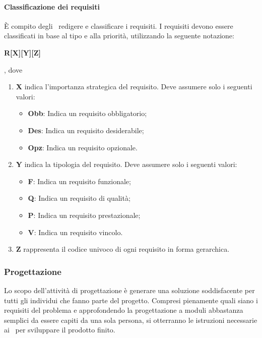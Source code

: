 \documentclass[../NormeProgetto.tex]{subfiles}
\begin{document}
				\paragraph{Classificazione dei requisiti}
					È compito degli \analisti\ redigere e classificare i requisiti.  I requisiti devono essere classificati in base al tipo e alla priorità, utilizzando la seguente notazione:
					\begin{center}\textbf{R[X][Y][Z]}\end{center}, dove
						\begin{enumerate}
							\item \textbf{X} indica l'importanza strategica del requisito. Deve assumere solo i seguenti valori:
							\begin{itemize}
								\item \textbf{Obb}: Indica un requisito obbligatorio;
								\item \textbf{Des}: Indica un requisito desiderabile;
								\item \textbf{Opz}: Indica un requisito opzionale.
							\end{itemize}
							\item \textbf{Y} indica la tipologia del requisito. Deve assumere solo i seguenti valori:
							\begin{itemize}
								\item \textbf{F}: Indica un requisito funzionale;
								\item \textbf{Q}: Indica un requisito di qualità;
								\item \textbf{P}: Indica un requisito prestazionale;
								\item \textbf{V}: Indica un requisito vincolo.
							\end{itemize}
							\item \textbf{Z} rappresenta il codice univoco di ogni requisito in forma gerarchica.
						\end{enumerate}
		\subsubsection{Progettazione}
			Lo scopo dell'attività di progettazione è generare una soluzione soddisfacente per tutti gli individui che fanno parte del progetto. Compresi pienamente quali siano i requisiti del problema e approfondendo la progettazione a moduli abbastanza semplici da essere capiti da una sola persona, si otterranno le istruzioni necessarie ai \programmatori\ per sviluppare il prodotto finito.
\end{document}

